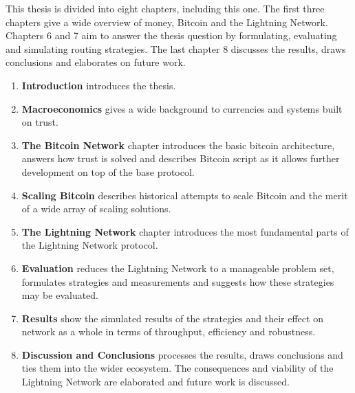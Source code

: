 This thesis is divided into eight chapters, including this one. The first three chapters give a wide overview of money, Bitcoin and the \gls{Lightning Network}. Chapters 6 and 7 aim to answer the thesis question by formulating, evaluating and simulating routing strategies. The last chapter 8 discusses the results, draws conclusions and elaborates on future work.

\begin{enumerate}
	\item \textbf{Introduction} introduces the thesis.
	\item \textbf{Macroeconomics} gives a wide background to currencies and systems built on trust. 
	\item \textbf{The Bitcoin Network} chapter introduces the basic \gls{bitcoin} architecture, answers how trust is solved and describes Bitcoin script as it allows further development on top of the base protocol.
	\item \textbf{Scaling Bitcoin} describes historical attempts to scale Bitcoin and the merit of a wide array of scaling solutions.
	\item \textbf{The \gls{Lightning Network}} chapter introduces the most fundamental parts of the Lightning Network protocol.
	\item \textbf{Evaluation} reduces the Lightning Network to a manageable problem set, formulates strategies and measurements and suggests how these strategies may be evaluated.
	\item \textbf{Results} show the simulated results of the strategies and their effect on network as a whole in terms of throughput, efficiency and robustness.
	\item \textbf{Discussion and Conclusions} processes the results, draws conclusions and ties them into the wider ecosystem. The consequences and viability of the Lightning Network are elaborated and future work is discussed.
\end{enumerate}